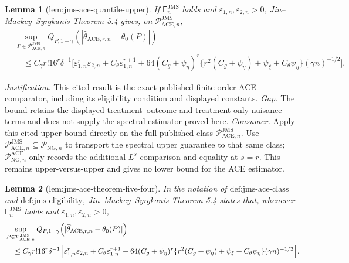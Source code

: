 \documentclass{article}
\newtheorem{lemma}{Lemma}
\begin{document}
\begin{lemma}[lem:jms-ace-quantile-upper]\label{lem:jms-ace-quantile-upper}
If \(\mathsf E_n^{\mathrm{JMS}}\) holds and \(\varepsilon_{1,n},\varepsilon_{2,n}>0\), Jin--Mackey--Syrgkanis Theorem 5.4 gives, on \(\mathcal P_{\mathrm{ACE},n}^{\mathrm{JMS}}\),
\[
 \begin{aligned}
 &\sup_{P\in\mathcal P_{\mathrm{ACE},n}^{\mathrm{JMS}}}
 Q_{P,1-\gamma}(|\widehat\theta_{\mathrm{ACE},r,n}-\theta_0(P)|)\\
 &\quad\le C_{\gamma}r!16^r\delta^{-1}
 \Big[\varepsilon_{1,n}^r\varepsilon_{2,n}
 +C_{\theta}\varepsilon_{1,n}^{r+1}
 +64(C_g+\psi_{\eta})^r
 \{r^2(C_g+\psi_{\eta})+\psi_{\xi}+C_{\theta}\psi_{\eta}\}
 (\gamma n)^{-1/2}\Big].
 \end{aligned}
\]
\end{lemma}
\par\smallskip\noindent \textit{Justification.} This cited result is the exact published finite-order ACE comparator, including its eligibility condition and displayed constants. \textit{Gap.} The bound retains the displayed treatment--outcome and treatment-only nuisance terms and does not supply the spectral estimator proved here. \textit{Consumer.} Apply this cited upper bound directly on the full published class \(\mathcal P_{\mathrm{ACE},n}^{\mathrm{JMS}}\). Use \(\mathcal P_{\mathrm{ACE},n}^{\mathrm{JMS}}\subseteq\mathcal P_{\mathrm{NG},n}\) to transport the spectral upper guarantee to that same class; \(\mathcal P_{\mathrm{NG},n}^{\mathrm{ACE}}\) only records the additional \(L^s\) comparison and equality at \(s=r\). This remains upper-versus-upper and gives no lower bound for the ACE estimator.

\begin{lemma}[lem:jms-ace-theorem-five-four]\label{lem:jms-ace-theorem-five-four}
In the notation of \(\text{def:jms-ace-class}\) and
\(\text{def:jms-eligibility}\), Jin--Mackey--Syrgkanis Theorem 5.4
states that, whenever \(\mathsf E_n^{\mathrm{JMS}}\) holds and
\(\varepsilon_{1,n},\varepsilon_{2,n}>0\),
\[
\begin{split}
 &\sup_{P\in\mathcal P_{\mathrm{ACE},n}^{\mathrm{JMS}}}
 Q_{P,1-\gamma}
 \!\left(|\widehat\theta_{\mathrm{ACE},r,n}-\theta_0(P)|\right)\\
 &\quad\le C_\gamma r!16^r\delta^{-1}
 \Bigl[\varepsilon_{1,n}^r\varepsilon_{2,n}
 +C_\theta\varepsilon_{1,n}^{r+1}
 +64(C_g+\psi_\eta)^r
 \{r^2(C_g+\psi_\eta)+\psi_\xi+C_\theta\psi_\eta\}
 (\gamma n)^{-1/2}\Bigr].
\end{split}
\]
\end{lemma}
\end{document}
